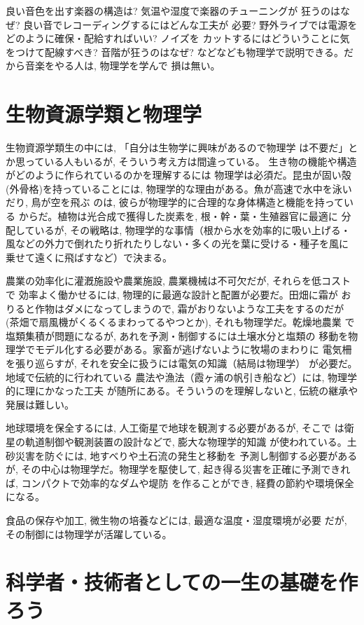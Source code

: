 良い音色を出す楽器の構造は? 気温や湿度で楽器のチューニングが
狂うのはなぜ? 良い音でレコーディングするにはどんな工夫が
必要? 野外ライブでは電源をどのように確保・配給すればいい? ノイズを
カットするにはどういうことに気をつけて配線すべき? 音階が狂うのはなぜ? 
などなども物理学で説明できる。だから音楽をやる人は, 物理学を学んで
損は無い。\hv

\section{生物資源学類と物理学}

生物資源学類生の中には, 「自分は生物学に興味があるので物理学
は不要だ」とか思っている人もいるが, そういう考え方は間違っている。
生き物の機能や構造がどのように作られているのかを理解するには
物理学は必須だ。昆虫が固い殻(外骨格)を持っていることには, 
物理学的な理由がある。魚が高速で水中を泳いだり, 鳥が空を飛ぶ
のは, 彼らが物理学的に合理的な身体構造と機能を持っている
からだ。植物は光合成で獲得した炭素を, 根・幹・葉・生殖器官に最適に
分配しているが, その戦略は, 物理学的な事情（根から水を効率的に吸い上げる・
風などの外力で倒れたり折れたりしない・多くの光を葉に受ける・種子を風に
乗せて遠くに飛ばすなど）で決まる。

農業の効率化に灌漑施設や農業施設, 農業機械は不可欠だが, それらを低コストで
効率よく働かせるには, 物理的に最適な設計と配置が必要だ。田畑に霜が
おりると作物はダメになってしまうので, 霜がおりないような工夫をするのだが
(茶畑で扇風機がくるくるまわってるやつとか), それも物理学だ。乾燥地農業
で塩類集積が問題になるが, あれを予測・制御するには土壌水分と塩類の
移動を物理学でモデル化する必要がある。家畜が逃げないように牧場のまわりに
電気柵を張り巡らすが, それを安全に扱うには電気の知識（結局は物理学）
が必要だ。地域で伝統的に行われている
農法や漁法（霞ヶ浦の帆引き船など）には, 物理学的に理にかなった工夫
が随所にある。そういうのを理解しないと, 伝統の継承や発展は難しい。

地球環境を保全するには, 人工衛星で地球を観測する必要があるが, そこで
は衛星の軌道制御や観測装置の設計などで, 膨大な物理学的知識
が使われている。土砂災害を防ぐには, 地すべりや土石流の発生と移動を
予測し制御する必要があるが, その中心は物理学だ。物理学を駆使して, 
起き得る災害を正確に予測できれば, コンパクトで効率的なダムや堤防
を作ることができ, 経費の節約や環境保全になる。

食品の保存や加工, 微生物の培養などには, 最適な温度・湿度環境が必要
だが, その制御には物理学が活躍している。
\hv

\section{科学者・技術者としての一生の基礎を作ろう}

